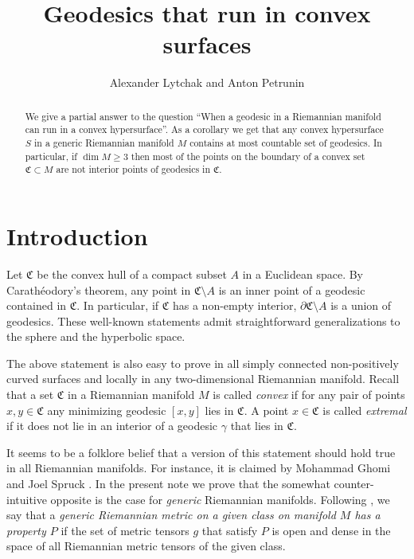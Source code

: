 \documentclass[a4paper,10pt]{article}
\begin{document}
 
\title{Geodesics that run in convex surfaces}
\author{Alexander Lytchak and Anton Petrunin}
\date{}
\maketitle

\begin{abstract}
We give a partial answer to the question ``When a geodesic in a Riemannian manifold can run in a convex hypersurface''.
As a corollary we get that any convex hypersurface $S$ in a generic Riemannian manifold $M$ contains at most countable set of geodesics.
In particular, if $\dim M\ge 3$ then most of the points on the boundary of a convex set $\mathfrak{C}\subset M$ are not interior points of geodesics in $\mathfrak{C}$.
\end{abstract}

\section{Introduction}
Let $\mathfrak{C}$ be the convex hull of a compact subset $A$ in a Euclidean space.
By Carathéodory's theorem, any point in $\mathfrak{C}\setminus A$ is an inner point of a geodesic contained in $\mathfrak{C}$.
In particular, if $\mathfrak{C}$ has a non-empty interior,  $\partial \mathfrak{C} \setminus A$ is  a union of geodesics.  
These well-known statements admit straightforward generalizations to the sphere and the hyperbolic space.
 
The above statement is also easy to prove in all simply connected non-positively curved surfaces and locally in any two-dimensional Riemannian manifold.
Recall that a set $\mathfrak{C}$ in a Riemannian manifold $M$ is called \emph{convex} if for any pair of points $x,y\in \mathfrak{C}$ any minimizing geodesic $[x,y]$ lies in $\mathfrak{C}$.
A point $x\in \mathfrak{C}$ is called \emph{extremal} if it does not lie in an interior of a geodesic $\gamma$ that lies in $\mathfrak{C}$.

It seems to be a folklore belief that a version of this statement should hold true in all Riemannian manifolds. 
For instance, it is claimed by Mohammad Ghomi and Joel Spruck \cite[Lemma 9.1]{Ghomi}.
In the present note we prove that the somewhat counter-intuitive opposite is the case for \emph{generic} Riemannian manifolds. 
Following \cite{eliashberg-mishachev}, we say that a \emph{generic Riemannian metric on a given class on manifold $M$ 
has a property $P$} if the set of metric tensors $g$ that satisfy $P$ is open and dense in the space of all Riemannian metric tensors of the given class.
\end{document}
